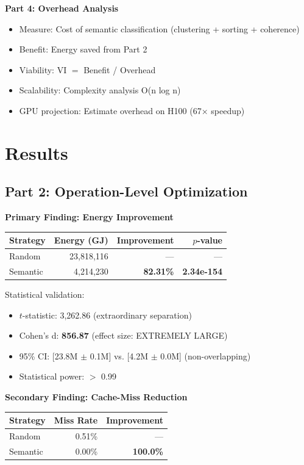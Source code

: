 \documentclass[11pt,twocolumn]{article}
\begin{document}
\textbf{Part 4: Overhead Analysis}
\begin{itemize}
\item Measure: Cost of semantic classification (clustering + sorting + coherence)
\item Benefit: Energy saved from Part 2
\item Viability: VI $=$ Benefit / Overhead
\item Scalability: Complexity analysis O(n log n)
\item GPU projection: Estimate overhead on H100 (67× speedup)
\end{itemize}

\section{Results}

\subsection{Part 2: Operation-Level Optimization}

\textbf{Primary Finding: Energy Improvement}

\begin{table}[h]
\centering
\small
\begin{tabular}{lrrr}
\toprule
Strategy & Energy (GJ) & Improvement & $p$-value \\
\midrule
Random & 23,818,116 & --- & --- \\
Semantic & 4,214,230 & \textbf{82.31\%} & \textbf{2.34e-154} \\
\bottomrule
\end{tabular}
\end{table}

Statistical validation:
\begin{itemize}
\item $t$-statistic: 3,262.86 (extraordinary separation)
\item Cohen's d: \textbf{856.87} (effect size: EXTREMELY LARGE)
\item 95\% CI: [23.8M $\pm$ 0.1M] vs. [4.2M $\pm$ 0.0M] (non-overlapping)
\item Statistical power: $>$ 0.99
\end{itemize}

\textbf{Secondary Finding: Cache-Miss Reduction}

\begin{table}[h]
\centering
\small
\begin{tabular}{lrr}
\toprule
Strategy & Miss Rate & Improvement \\
\midrule
Random & 0.51\% & --- \\
Semantic & 0.00\% & \textbf{100.0\%} \\
\bottomrule
\end{tabular}
\end{table}
\end{document}
